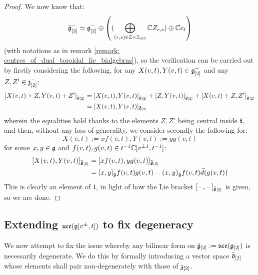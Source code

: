                 \begin{proof}
                    We now know that:
                        $$\tilde{\g}_{[2]}^- \cong \g_{[2]}^- \oplus \left( ( \bigoplus_{(r, s) \in \Z \x \Z_{\leq 0}} \bbC Z_{r, s}) \oplus \bbC c_t \right)$$
                    (with notations as in remark \ref{remark: centres_of_dual_toroidal_lie_bialgebras}), so the verification can be carried out by firstly considering the following, for any $X(v, t), Y(v, t) \in \mathfrak{g}_{[2]}^-$ and any $Z, Z' \in \mathfrak{z}_{[2]}^-$:
                        $$
                            \begin{aligned}
                                [ X(v, t) + Z, Y(v, t) + Z' ]_{\tilde{\g}_{[2]}} & = [ X(v, t), Y(v, t) ]_{\tilde{\g}_{[2]}} + [ Z, Y(v, t) ]_{\tilde{\g}_{[2]}} + [X(v, t) + Z, Z']_{\tilde{\g}_{[2]}}
                                \\
                                & = [ X(v, t), Y(v, t) ]_{\tilde{\g}_{[2]}}
                            \end{aligned}
                        $$
                    wherein the equalities hold thanks to the elements $Z, Z'$ being central inside $\mathfrak{t}$, and then, without any loss of generality, we consider secondly the following for:
                        $$X(v, t) := x f(v, t), Y(v, t) := y g(v, t)$$
                    for some $x, y \in \mathfrak{g}$ and $f(v, t), g(v, t) \in t^{-1}\mathbb{C}[v^{\pm 1}, t^{-1}]$:
                        $$
                            \begin{aligned}
                                [ X(v, t), Y(v, t) ]_{\tilde{\g}_{[2]}} & = [ x f(v, t), y g(v, t) ]_{\tilde{\g}_{[2]}}
                                \\
                                & = [x, y]_{\g} f(v, t) g(v, t) - (x, y)_{\g} f(v, t) \bar{d}( g(v, t) )
                            \end{aligned}
                        $$
                    This is clearly an element of $\mathfrak{t}$, in light of how the Lie bracket $[-, -]_{\tilde{\mathfrak{g}}_{[2]}}$ is given, so we are done. 
                \end{proof}

        \subsection{Extending \texorpdfstring{$ \mathfrak{uce}(\mathfrak{g}[v^{\pm}, t]) $}{} to fix degeneracy}
            We now attempt to fix the issue whereby any bilinear form on $\tilde{\mathfrak{g}}_{[2]}:= \mathfrak{uce}(\mathfrak{g}_{[2]})$ is necessarily degenerate. We do this by formally introducing a  vector space $\bar{\mathfrak{d}}_{[2]}$ whose elements shall pair non-degenerately with those of $\mathfrak{z}_{[2]}$. 

